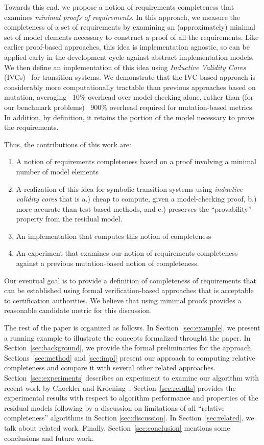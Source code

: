 \noindent Towards this end, we propose a notion of requirements completeness that examines {\em minimal proofs of requirements}.  In this approach, we measure the completeness of a set of requirements by examining an (approximately) minimal set of model elements necessary to construct a proof of all the requirements.  Like earlier proof-based approaches, this idea is implementation agnostic, so can be applied early in the development cycle against abstract implementation models.  We then define an implementation of this idea using {\em Inductive Validity Cores} (IVCs)~\cite{Ghass16} for transition systems.  We demonstrate that the IVC-based approach is considerably more computationally tractable than previous approaches based on mutation, averaging ~10\% overhead over model-checking alone, rather than (for our benchmark problems) ~900\% overhead required for mutation-based metrics.  In addition, by definition, it retains the portion of the model necessary to prove the requirements.

Thus, the contributions of this work are:
\begin{enumerate}
\item A notion of requirements completeness based on a proof involving a minimal number of model elements
\item A realization of this idea for symbolic transition systems using {\em inductive validity cores} that is a.) cheap to compute, given a model-checking proof, b.) more accurate than test-based methods, and c.) preserves the ``provability'' property from the residual model.
\item An implementation that computes this notion of completeness
\item An experiment that examines our notion of requirements completeness against a previous mutation-based notion of completeness.
\end{enumerate}

\noindent Our eventual goal is to provide a definition of completeness of requirements that can be established using formal verification-based approaches that is acceptable to certification authorities.  We believe that using minimal proofs provides a reasonable candidate metric for this discussion.


The rest of the paper is organized as follows.  In Section~\ref{sec:example}, we present a running example to illustrate the concepts formalized throught the paper.  In Section~\ref{sec:background}, we provide the formal preliminaries for the approach.  Sections~\ref{sec:method} and \ref{sec:impl} present our approach to computing relative completeness and compare it with several other related approaches.  Section~\ref{sec:experiments} describes an experiment to examine our algorithm with recent work by Chockler and Kroening~\cite{chockler2010coverage}. Section~\ref{sec:results} provides the experimental results with respect to algorithm performance and properties of the residual models following by a discussion on limitations of all ``relative completeness'' algorithms in Section \ref{sec:discussion}.  In Section~\ref{sec:related}, we talk about related work.  Finally, Section~\ref{sec:conclusion} mentions some conclusions and future work.

